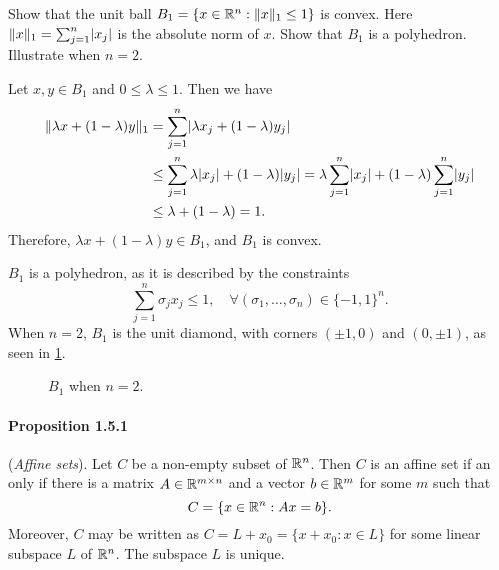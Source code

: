 \begin{exercise}
  Show that the unit ball $B_1 = \{ x \in \mathbb{R}^n : \lVert x\rVert_1 \leq 1 \}$ is convex.
  Here $\lVert x\rVert_1 = \sum_{j=1}^n \lvert x_j\rvert$ is the absolute norm of $x$.
  Show that $B_1$ is a polyhedron.
  Illustrate when $n = 2$.
\end{exercise}

\begin{solution}
  Let $x, y \in B_1$ and $0 \leq \lambda \leq 1$.
  Then we have
  \begin{equation}
    \begin{split}
      \lVert\lambda x + (1 - \lambda) y\rVert_1
      &= \sum_{j=1}^n \lvert\lambda x_j + (1 - \lambda) y_j\rvert \\
      &\leq \sum_{j=1}^n \lambda \lvert x_j\rvert + (1 - \lambda) \lvert y_j\rvert
      = \lambda \sum_{j=1}^n \lvert x_j\rvert + (1 - \lambda)\sum_{j=1}^n \lvert y_j\rvert \\
      &\leq \lambda + (1 - \lambda) = 1.
    \end{split}
  \end{equation}
  Therefore, $\lambda x + (1 - \lambda) y \in B_1$, and $B_1$ is convex.

  $B_1$ is a polyhedron, as it is described by the constraints
  \begin{equation}
    \sum_{j = 1}^{n} \sigma_j x_j \leq 1, \quad \forall (\sigma_1, \ldots, \sigma_n) \in \{-1, 1\}^n.
  \end{equation}
  When $n = 2$, $B_1$ is the unit diamond, with corners $(\pm 1, 0)$ and $(0, \pm 1)$, as seen in \cref{fig:unit_diamond}.

  \begin{figure}[htbp]
    \centering
    \resizebox{0.4\textwidth}{!}{
      
    }
    \caption{$B_1$ when $n = 2$.\label{fig:unit_diamond}}
  \end{figure}
\end{solution}

\paragraph{Proposition 1.5.1} (\emph{Affine sets}).
Let $C$ be a non-empty subset of $\mathbb{R}^n$.
Then $C$ is an affine set if an only if there is a matrix $A \in \mathbb{R}^{m \times n}$ and a vector $b \in \mathbb{R}^m$ for some $m$ such that
\begin{equation}
  C = \{ x \in \mathbb{R}^n : Ax = b \}.
\end{equation}
Moreover, $C$ may be written as $C = L + x_0 = \{ x + x_0 : x \in L \}$ for some linear subspace $L$ of $\mathbb{R}^n$.
The subspace $L$ is unique.

